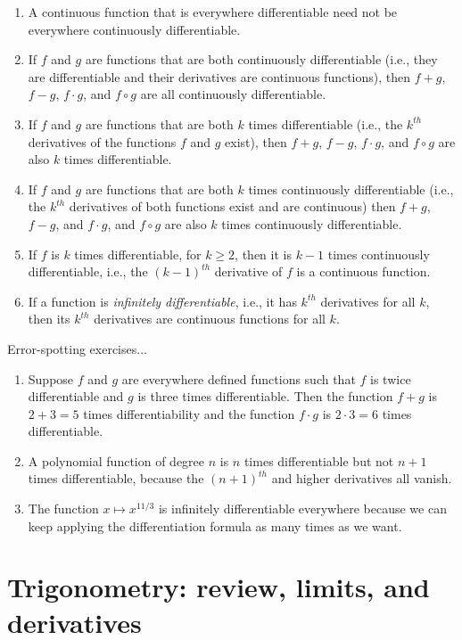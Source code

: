 \documentclass[10pt]{amsart}
\begin{document}
\begin{enumerate}
\item A continuous function that is everywhere differentiable need not
  be everywhere continuously differentiable.
\item If $f$ and $g$ are functions that are both continuously
  differentiable (i.e., they are differentiable and their derivatives
  are continuous functions), then $f + g$, $f - g$, $f \cdot g$, and
  $f \circ g$ are all continuously differentiable.
\item If $f$ and $g$ are functions that are both $k$ times
  differentiable (i.e., the $k^{th}$ derivatives of the functions $f$
  and $g$ exist), then $f + g$, $f - g$, $f \cdot g$, and $f \circ g$
  are also $k$ times differentiable.
\item If $f$ and $g$ are functions that are both $k$ times
  continuously differentiable (i.e., the $k^{th}$ derivatives of both
  functions exist and are continuous) then $f + g$, $f - g$, and $f
  \cdot g$, and $f \circ g$ are also $k$ times continuously
  differentiable.
\item If $f$ is $k$ times differentiable, for $k \ge 2$, then it is
  $k-1$ times continuously differentiable, i.e., the $(k-1)^{th}$
  derivative of $f$ is a continuous function.
\item If a function is {\em infinitely differentiable}, i.e., it has
  $k^{th}$ derivatives for all $k$, then its $k^{th}$ derivatives are
  continuous functions for all $k$.
\end{enumerate}

Error-spotting exercises...

\begin{enumerate}
\item Suppose $f$ and $g$ are everywhere defined functions such that
  $f$ is twice differentiable and $g$ is three times
  differentiable. Then the function $f + g$ is $2 + 3 = 5$ times
  differentiability and the function $f \cdot g$ is $2 \cdot 3 = 6$
  times differentiable.
\item A polynomial function of degree $n$ is $n$ times differentiable
  but not $n + 1$ times differentiable, because the $(n+1)^{th}$ and
  higher derivatives all vanish.
\item The function $x \mapsto x^{11/3}$ is infinitely differentiable
  everywhere because we can keep applying the differentiation formula as
  many times as we want.
\end{enumerate}

\section{Trigonometry: review, limits, and derivatives}
\end{document}
